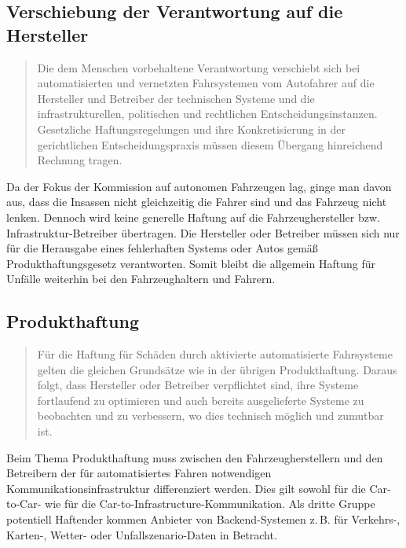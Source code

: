 \documentclass[twoside,a4paper,12pt]{article}
\begin{document}
\subsection{Verschiebung der Verantwortung auf die Hersteller} \label{VerschiebungDerVerantwortungAufDieHersteller}

\begin{quote}
\glqq
Die dem Menschen vorbehaltene Verantwortung verschiebt sich bei automatisierten und
vernetzten Fahrsystemen vom Autofahrer auf die Hersteller und Betreiber der technischen Systeme und die infrastrukturellen, 
politischen und rechtlichen Entscheidungsinstanzen. Gesetzliche Haftungsregelungen und ihre Konkretisierung in der gerichtlichen
Entscheidungspraxis müssen diesem Übergang hinreichend Rechnung tragen.\grqq\mbox{~\cite[S. 11]{ek}}
\end{quote}
Da der Fokus der Kommission auf autonomen Fahrzeugen lag, ginge man davon aus, dass die Insassen nicht gleichzeitig die Fahrer sind und das Fahrzeug nicht lenken. Dennoch wird keine generelle Haftung auf die Fahrzeughersteller bzw. Infrastruktur-Betreiber übertragen. Die Hersteller oder Betreiber müssen sich nur für die Herausgabe eines fehlerhaften Systems oder Autos gemäß Produkthaftungsgesetz verantworten. Somit bleibt die allgemein Haftung für Unfälle weiterhin bei den Fahrzeughaltern und Fahrern.

\subsection{Produkthaftung} \label{Produkthaftung}

\begin{quote}
\glqq
Für die Haftung für Schäden durch aktivierte automatisierte Fahrsysteme gelten die gleichen Grundsätze wie in der übrigen 
Produkthaftung. Daraus folgt, dass Hersteller oder
Betreiber verpflichtet sind, ihre Systeme fortlaufend zu optimieren und auch bereits ausgelieferte Systeme zu beobachten und zu 
verbessern, wo dies technisch möglich und zumutbar ist.\grqq\mbox{~\cite[S. 12]{ek}}
\end{quote}

Beim Thema Produkthaftung muss zwischen den Fahrzeugherstellern und den Betreibern der für automatisiertes Fahren notwendigen
Kommunikationsinfrastruktur differenziert werden. Dies gilt sowohl für die Car-to-Car- wie für die Car-to-Infrastructure-Kommunikation.
Als dritte Gruppe potentiell Haftender kommen Anbieter von Backend-Systemen z.\,B. für Verkehrs-, Karten-, Wetter- oder Unfallszena\-rio-Daten 
in Betracht. 
\end{document}
